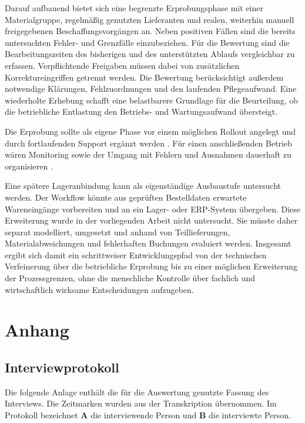 \documentclass[a4paper,12pt]{article}
\renewcommand{\thesection}{\arabic{section}.}
\renewcommand{\thesubsection}{\thesection\arabic{subsection}.}
\begin{document}
Darauf aufbauend bietet sich eine begrenzte Erprobungsphase mit einer Materialgruppe, regelmäßig genutzten Lieferanten und realen, weiterhin manuell freigegebenen Beschaffungsvorgängen an. Neben positiven Fällen sind die bereits untersuchten Fehler- und Grenzfälle einzubeziehen. Für die Bewertung sind die Bearbeitungszeiten des bisherigen und des unterstützten Ablaufs vergleichbar zu erfassen. Verpflichtende Freigaben müssen dabei von zusätzlichen Korrektureingriffen getrennt werden. Die Bewertung berücksichtigt außerdem notwendige Klärungen, Fehlzuordnungen und den laufenden Pflegeaufwand. Eine wiederholte Erhebung schafft eine belastbarere Grundlage für die Beurteilung, ob die betriebliche Entlastung den Betriebs- und Wartungsaufwand übersteigt.

Die Erprobung sollte als eigene Phase vor einem möglichen Rollout angelegt und durch fortlaufenden Support ergänzt werden \parencite{herm_framework_2023}. Für einen anschließenden Betrieb wären Monitoring sowie der Umgang mit Fehlern und Ausnahmen dauerhaft zu organisieren \parencite{moreira_methodology_2025}.

Eine spätere Lageranbindung kann als eigenständige Ausbaustufe untersucht werden. Der Workflow könnte aus geprüften Bestelldaten erwartete Wareneingänge vorbereiten und an ein Lager- oder ERP-System übergeben. Diese Erweiterung wurde in der vorliegenden Arbeit nicht untersucht. Sie müsste daher separat modelliert, umgesetzt und anhand von Teillieferungen, Materialabweichungen und fehlerhaften Buchungen evaluiert werden. Insgesamt ergibt sich damit ein schrittweiser Entwicklungspfad von der technischen Verfeinerung über die betriebliche Erprobung bis zu einer möglichen Erweiterung der Prozessgrenzen, ohne die menschliche Kontrolle über fachlich und wirtschaftlich wirksame Entscheidungen aufzugeben.

\clearpage
\printbibliography[heading=bibintoc, title={Literaturverzeichnis}]

\clearpage
\appendix
\edef\BachelorAppendixStartPage{\number\value{page}}
\setcounter{page}{\BachelorAppendixStartPage}
\pagestyle{appendixpages}
\thispagestyle{appendixpages}
\renewcommand{\thesubsection}{\thesection\arabic{subsection}}
\section{Anhang}

\subsection{Interviewprotokoll}
\label{anhang:interviewleitfaden}
Die folgende Anlage enthält die für die Auswertung genutzte Fassung des Interviews. Die Zeitmarken wurden aus der Transkription übernommen. Im Protokoll bezeichnet \textbf{A} die interviewende Person und \textbf{B} die interviewte Person.
\end{document}
